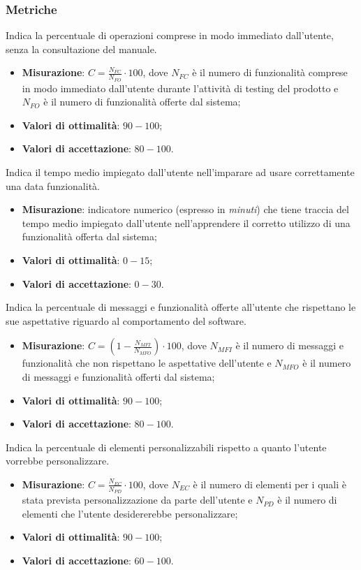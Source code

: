 \subsubsection{Metriche}
\label{comprFunzOfferte}
Indica la percentuale di operazioni comprese in modo immediato dall'utente, senza la consultazione del manuale.
\begin{itemize}
\item \textbf{Misurazione}: $C=\frac{N_{FC}}{N_{FO}} \cdot 100$, dove $N_{FC}$ è il numero di funzionalità comprese in modo immediato dall'utente durante l'attività di testing del prodotto e $N_{FO}$ è il numero di funzionalità offerte dal sistema;
\item \textbf{Valori di ottimalità}: $90 - 100$;
\item \textbf{Valori di accettazione}: $80 - 100$.
\end{itemize}
\label{facilitaApprFunz}
Indica il tempo medio impiegato dall'utente nell'imparare ad usare correttamente una data funzionalità.
\begin{itemize}
\item \textbf{Misurazione}: indicatore numerico (espresso in \textit{minuti}) che tiene traccia del tempo medio impiegato dall'utente nell'apprendere il corretto utilizzo di una funzionalità offerta dal sistema;
\item \textbf{Valori di ottimalità}: $0 - 15$;
\item \textbf{Valori di accettazione}: $0 - 30$.
\end{itemize}
\label{consistenzaOpInUso}
Indica la percentuale di messaggi e funzionalità offerte all'utente che rispettano le sue aspettative riguardo al comportamento del software.
\begin{itemize}
\item \textbf{Misurazione}: $C=(1-\frac{N_{MFI}}{N_{MFO}}) \cdot 100$, dove $N_{MFI}$ è il numero di messaggi e funzionalità che non rispettano le aspettative dell'utente e $N_{MFO}$ è il numero di messaggi e funzionalità offerti dal sistema;
\item \textbf{Valori di ottimalità}: $90 - 100$;
\item \textbf{Valori di accettazione}: $80 - 100$.
\end{itemize}
\label{elemPers}
Indica la percentuale di elementi personalizzabili rispetto a quanto l'utente vorrebbe personalizzare.
\begin{itemize}
\item \textbf{Misurazione}: $C=\frac{N_{EC}}{N_{PD}} \cdot 100$, dove $N_{EC}$ è il numero di elementi per i quali è stata prevista personalizzazione da parte dell'utente e $N_{PD}$ è il numero di elementi che l'utente desidererebbe personalizzare;
\item \textbf{Valori di ottimalità}: $90 - 100$;
\item \textbf{Valori di accettazione}: $60 - 100$.
\end{itemize}
